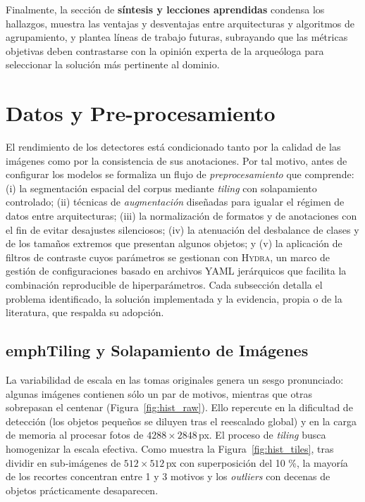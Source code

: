Finalmente, la sección de \textbf{síntesis y lecciones aprendidas} condensa los hallazgos, muestra las ventajas y desventajas entre arquitecturas y algoritmos de agrupamiento, y plantea líneas de trabajo futuras, subrayando que las métricas objetivas deben contrastarse con la opinión experta de la arqueóloga para seleccionar la solución más pertinente al dominio.
\section{Datos y Pre-procesamiento}\label{sec:datos}

El rendimiento de los detectores está condicionado tanto por la calidad de las imágenes como por la consistencia de sus anotaciones.
Por tal motivo, antes de configurar los modelos se formaliza un flujo de \textit{preprocesamiento} que comprende:
(i) la segmentación espacial del corpus mediante \emph{tiling} con solapamiento controlado;
(ii) técnicas de \emph{augmentación} diseñadas para igualar el régimen de datos entre arquitecturas;
(iii) la normalización de formatos y de anotaciones con el fin de evitar desajustes silenciosos;
(iv) la atenuación del desbalance de clases y de los tamaños extremos que presentan algunos objetos;
y (v) la aplicación de filtros de contraste cuyos parámetros se gestionan con \textsc{Hydra}, un marco de gestión de configuraciones basado en archivos YAML jerárquicos que facilita la combinación reproducible de hiperparámetros.
Cada subsección detalla el problema identificado, la solución implementada y la evidencia, propia o de la literatura, que respalda su adopción.


\subsection{emph{Tiling} y Solapamiento de Imágenes}\label{ssec:tiling}

La variabilidad de escala en las tomas originales genera un sesgo pronunciado: algunas imágenes contienen sólo un par de motivos, mientras que otras sobrepasan el centenar (Figura~\ref{fig:hist_raw}).
Ello repercute en la dificultad de detección (los objetos pequeños se diluyen tras el reescalado global) y en la carga de memoria al procesar fotos de \(4288\times2848\)\,px.
El proceso de \emph{tiling} busca homogenizar la escala efectiva.
Como muestra la Figura~\ref{fig:hist_tiles}, tras dividir en sub‐imágenes de \(512\times512\)\,px con superposición del 10 \%, la mayoría de los recortes concentran entre 1 y 3 motivos y los \emph{outliers} con decenas de objetos prácticamente desaparecen.

